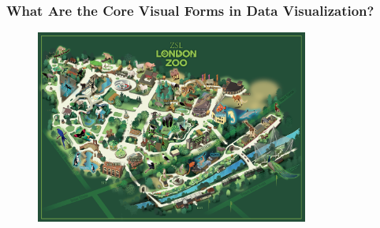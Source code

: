 \documentclass[aspectratio=1610]{beamer}
\begin{document}
\begin{frame}
	\frametitle{What Are the Core Visual Forms in Data Visualization?}
	\begin{figure}
		\begin{center}
			\includegraphics[width=0.8\textwidth]{figures/zoo.png}
		\end{center}
	\end{figure}
\end{frame}
\end{document}
